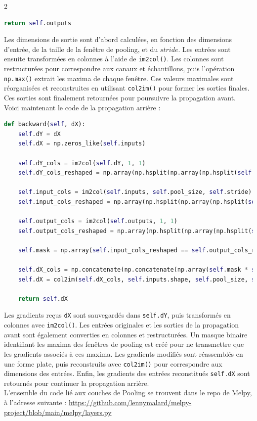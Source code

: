 \begin{multicols}{2}
\begin{lstlisting}[language=Python]
    return self.outputs
\end{lstlisting}
\hfill\break

Les dimensions de sortie sont d’abord calculées, en fonction des dimensions d’entrée, 
de la taille de la fenêtre de pooling, et du $stride$. Les entrées sont ensuite 
transformées en colonnes à l’aide de \texttt{im2col()}. Les colonnes sont restructurées pour 
correspondre aux canaux et échantillons, puis l’opération \texttt{np.max()}
extrait les maxima de chaque fenêtre. Ces valeurs maximales sont réorganisées et 
reconstruites en utilisant \texttt{col2im()} pour former les sorties finales.
Ces sorties sont finalement retournées pour poursuivre la propagation avant.\\

Voici maintenant le code de la propagation arrière : \\

\begin{lstlisting}[language=Python]
def backward(self, dX):
    self.dY = dX
    self.dX = np.zeros_like(self.inputs)

    self.dY_cols = im2col(self.dY, 1, 1)
    self.dY_cols_reshaped = np.array(np.hsplit(np.array(np.hsplit(self.dY_cols, self.dY.shape[0])), self.dY.shape[1])).transpose(0, 1, 3, 2)

    self.input_cols = im2col(self.inputs, self.pool_size, self.stride)
    self.input_cols_reshaped = np.array(np.hsplit(np.array(np.hsplit(self.input_cols, self.inputs.shape[0])), self.inputs.shape[1])).transpose(0, 1, 3, 2)

    self.output_cols = im2col(self.outputs, 1, 1)
    self.output_cols_reshaped = np.array(np.hsplit(np.array(np.hsplit(self.output_cols, self.inputs.shape[0])), self.inputs.shape[1])).transpose(0, 1, 3, 2)

    self.mask = np.array(self.input_cols_reshaped == self.output_cols_reshaped, dtype=np.uint64)

    self.dX_cols = np.concatenate(np.concatenate(np.array(self.mask * self.dY_cols_reshaped).transpose(0, 1, 3, 2), axis=1), axis=1)
    self.dX = col2im(self.dX_cols, self.inputs.shape, self.pool_size, self.stride)

    return self.dX
\end{lstlisting}
\hfill\break

Les gradients reçus \texttt{dX} sont sauvegardés dans \texttt{self.dY}, puis 
transformés en colonnes avec \texttt{im2col()}. Les entrées 
originales et les sorties de la propagation avant sont également converties en colonnes et 
restructurées. Un masque binaire identifiant les maxima des fenêtres de pooling est créé 
pour ne transmettre que les gradients associés à ces maxima. Les gradients modifiés sont 
réassemblés en une forme plate, puis reconstruits avec \texttt{col2im()} pour correspondre 
aux dimensions des entrées. Enfin, les gradients des entrées reconstitués \texttt{self.dX}
sont retournés pour continuer la propagation arrière. \\

L'ensemble du code lié aux couches de Pooling se trouvent dans le repo de Melpy, à l'adresse suivante : \url{https://github.com/lennymalard/melpy-project/blob/main/melpy/layers.py}

\end{multicols}


